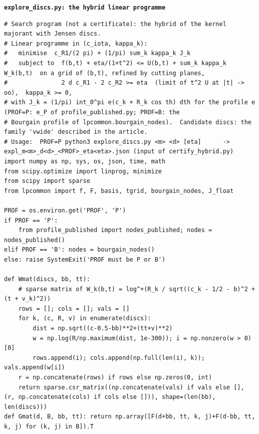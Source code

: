 \documentclass[11pt,reqno]{amsart}
\numberwithin{equation}{section}
\theoremstyle{definition}
\theoremstyle{remark}
\newcommand{\appsub}[1]{\par\medskip\noindent\textbf{#1}\par\nobreak\smallskip}
\begin{document}
\appsub{\texttt{explore\_discs.py: the hybrid linear programme}}
\begin{lstlisting}
# Search program (not a certificate): the hybrid of the kernel majorant with Jensen discs.
# Linear programme in (c_iota, kappa_k):
#   minimise  c_R1/(2 pi) + (1/pi) sum_k kappa_k J_k
#   subject to  f(b,t) + eta/(1+t^2) <= U(b,t) + sum_k kappa_k W_k(b,t)  on a grid of (b,t), refined by cutting planes,
#               2 d c_R1 - 2 c_R2 >= eta  (limit of t^2 U at |t| -> oo),  kappa_k >= 0,
# with J_k = (1/pi) int_0^pi e(c_k + R_k cos th) dth for the profile e (PROF=P: e_P of profile_published.py; PROF=B: the
# Bourgain profile of lpcommon.bourgain_nodes).  Candidate discs: the family 'vwide' described in the article.
# Usage:  PROF=P python3 explore_discs.py <m> <d> [eta]      -> expl_m<m>_d<d>_<PROF>_eta<eta>.json (input of certify_hybrid.py)
import numpy as np, sys, os, json, time, math
from scipy.optimize import linprog, minimize
from scipy import sparse
from lpcommon import f, F, basis, tgrid, bourgain_nodes, J_float

PROF = os.environ.get('PROF', 'P')
if PROF == 'P':
    from profile_published import nodes_published; nodes = nodes_published()
elif PROF == 'B': nodes = bourgain_nodes()
else: raise SystemExit('PROF must be P or B')

def Wmat(discs, bb, tt):
    # sparse matrix of W_k(b,t) = log^+(R_k / sqrt((c_k - 1/2 - b)^2 + (t + v_k)^2))
    rows = []; cols = []; vals = []
    for k, (c, R, v) in enumerate(discs):
        dist = np.sqrt((c-0.5-bb)**2+(tt+v)**2)
        w = np.log(R/np.maximum(dist, 1e-300)); i = np.nonzero(w > 0)[0]
        rows.append(i); cols.append(np.full(len(i), k)); vals.append(w[i])
    r = np.concatenate(rows) if rows else np.zeros(0, int)
    return sparse.csr_matrix((np.concatenate(vals) if vals else [], (r, np.concatenate(cols) if cols else [])), shape=(len(bb), len(discs)))
def Gmat(d, B, bb, tt): return np.array([F(d+bb, tt, k, j)+F(d-bb, tt, k, j) for (k, j) in B]).T


\end{lstlisting}
\end{document}
